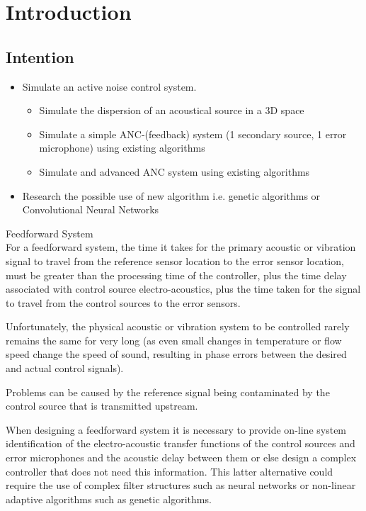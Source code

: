 \chapter{Introduction}
\label{chap:introduction}


\section{Intention}
    \begin{itemize}
        \item Simulate an active noise control system. 
    \begin{itemize}
        \item Simulate the dispersion of an acoustical source in a 3D space
        \item Simulate a simple ANC-(feedback) system (1 secondary source, 1 error microphone) using existing algorithms
        \item Simulate and advanced ANC system using existing algorithms
    \end{itemize}
        \item Research the possible use of new algorithm i.e. genetic algorithms or Convolutional Neural Networks
\end{itemize}



\large{Feedforward System}\\
For a feedforward system, the time it takes for the primary acoustic or vibration signal to travel from the reference sensor location to the error sensor location, must be greater than the processing time of the controller, plus the time delay associated with control source electro-acoustics, plus the time taken for the signal to travel from the control sources to the error sensors.\cite{Fuller1995}

Unfortunately, the physical acoustic or vibration system to
be controlled rarely remains the same for very long (as even small changes in temperature or
flow speed change the speed of sound, resulting in phase errors between the desired and
actual control signals).\cite{Fuller1995}

Problems can be caused by the reference signal being contaminated by the control source that is transmitted upstream.\cite{Fuller1995}

When designing a feedforward system it is necessary to provide on-line system identification of the electro-acoustic transfer functions of the control sources and error microphones and the acoustic delay between them or else design a complex controller that does not need this information. This latter alternative could require the use of complex filter structures such as neural networks or non-linear adaptive algorithms such as genetic algorithms.\cite{Fuller1995}

